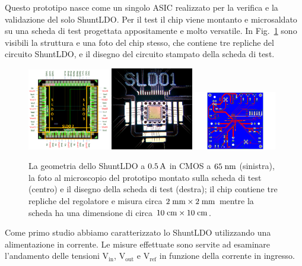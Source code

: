 Questo prototipo nasce come un singolo ASIC realizzato per la verifica e la validazione del solo ShuntLDO. Per il test il chip viene montanto e microsaldato su una scheda di test progettata appositamente e molto versatile. In Fig.~\ref{PCB05A} sono visibili la struttura e una foto del chip stesso, che contiene tre repliche del circuito ShuntLDO, e il disegno del circuito stampato della scheda di test.
\begin{figure}
\centering
\includegraphics[width=0.32\textwidth]{Immagini/chipSLDO05A.png}
\hfill
\includegraphics[width=0.32\textwidth]{Immagini/chip05_foto.png}
\hfill
\includegraphics[width=0.32\textwidth]{Immagini/pcb05.pdf}
\caption{La geometria dello ShuntLDO a $0.5\rm \, A$ in CMOS a $65\rm \; nm$ (sinistra), la foto al microscopio del prototipo montato sulla scheda di test (centro) e il disegno della scheda di test (destra); il chip contiene tre repliche del regolatore e misura circa $2\rm \; mm\times 2\rm \; mm$ mentre la scheda ha una dimensione di circa $10\rm \; cm \times 10\rm \; cm$.}
\label{PCB05A}
\end{figure}
Come primo studio abbiamo caratterizzato lo ShuntLDO utilizzando una alimentazione in corrente. Le misure effettuate sono servite ad esaminare l'andamento delle tensioni $\mathrm{V_{in}}$, $\mathrm{V_{out}}$ e $\mathrm{V_{ref}}$ in funzione della corrente in ingresso.

